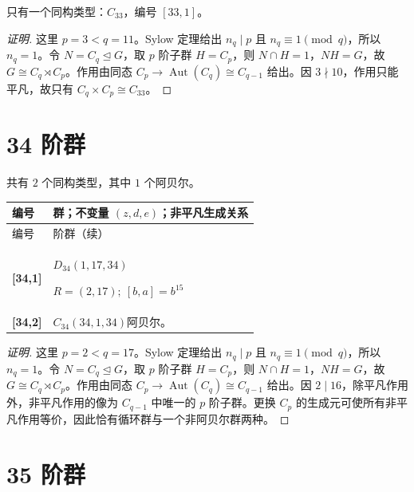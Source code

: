 \documentclass[UTF8,fontset=fandol,11pt,a4paper]{ctexart}
\newcommand{\Aut}{\operatorname{Aut}}\newcommand{\GL}{\operatorname{GL}}\newcommand{\ord}{\operatorname{ord}}\newcommand{\Z}{\mathrm Z}
\begin{document}
只有一个同构类型：$C_{33}$，编号 $[33,1]$。

\begin{proof}[证明]
这里 $p=3<q=11$。Sylow 定理给出 $n_q\mid p$ 且 $n_q\equiv1\pmod q$，所以 $n_q=1$。令 $N=C_q\trianglelefteq G$，取 $p$ 阶子群 $H=C_p$，则 $N\cap H=1$，$NH=G$，故 $G\cong C_q\rtimes C_p$。作用由同态 $C_p\to\Aut(C_q)\cong C_{q-1}$ 给出。因 $3\nmid 10$，作用只能平凡，故只有 $C_q\times C_p\cong C_{33}$。
\end{proof}

\section*{34 阶群}\label{order:34}

共有 $2$ 个同构类型，其中 $1$ 个阿贝尔。

\begingroup\small\setlength{\tabcolsep}{3pt}\renewcommand{\arraystretch}{1.12}

\begin{longtable}{@{}p{17mm}>{\raggedright\arraybackslash}p{141mm}@{}}

\toprule 编号 & 群；不变量 $(z,d,e)$；非平凡生成关系\\\midrule\endfirsthead

\toprule 编号 & 34 阶群（续）\\\midrule\endhead\bottomrule\endfoot

\textbf{[34,1]} & $D_{34}$\quad $(1,17,34)$\par\(R=(2,17);\allowbreak\ [b,a]=b^{15}\)\\[3pt]

\textbf{[34,2]} & $C_{34}$\quad $(34,1,34)$\quad 阿贝尔。\\[3pt]

\end{longtable}\endgroup

\begin{proof}[证明]
这里 $p=2<q=17$。Sylow 定理给出 $n_q\mid p$ 且 $n_q\equiv1\pmod q$，所以 $n_q=1$。令 $N=C_q\trianglelefteq G$，取 $p$ 阶子群 $H=C_p$，则 $N\cap H=1$，$NH=G$，故 $G\cong C_q\rtimes C_p$。作用由同态 $C_p\to\Aut(C_q)\cong C_{q-1}$ 给出。因 $2\mid 16$，除平凡作用外，非平凡作用的像为 $C_{q-1}$ 中唯一的 $p$ 阶子群。更换 $C_p$ 的生成元可使所有非平凡作用等价，因此恰有循环群与一个非阿贝尔群两种。
\end{proof}

\section*{35 阶群}\label{order:35}
\end{document}
